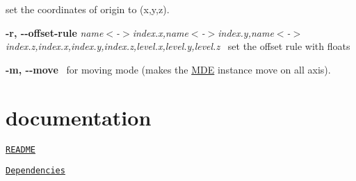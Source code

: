 \begin{DoxyItemize}
 set the coordinates of origin to (x,y,z). 
\item {\bfseries -\/r, -\/-\/offset-\/rule} {\itshape name$<$-\/$>$index.\+x,name$<$-\/$>$index.\+y,name$<$-\/$>$index.\+z,index.\+x,index.\+y,index.\+z,level.\+x,level.\+y,level.\+z}~\newline
 set the offset rule with floats 
\item {\bfseries -\/m, -\/-\/move}~\newline
 for moving mode (makes the \hyperlink{classMDE}{M\+DE} instance move on all axis). 
\end{DoxyItemize}\hypertarget{index_Other}{}\section{documentation}\label{index_Other}

\begin{DoxyItemize}
\item \href{https://github.com/Gweno/MDE/blob/master/README.md}{\tt R\+E\+A\+D\+ME} 
\item \href{https://github.com/Gweno/MDE/blob/master/dependencies.txt}{\tt Dependencies} 
\end{DoxyItemize}